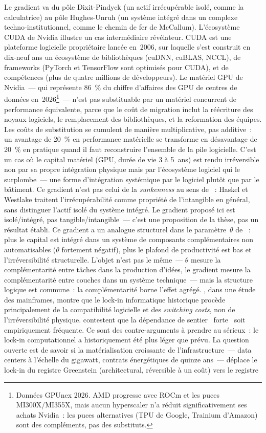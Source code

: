 Le gradient va du pôle Dixit-Pindyck (un actif irrécupérable isolé, comme la calculatrice) au pôle Hughes-Unruh (un système intégré dans un complexe techno-institutionnel, comme le chemin de fer de McCallum). L'écosystème CUDA de Nvidia illustre un cas intermédiaire révélateur. CUDA est une plateforme logicielle propriétaire lancée en~2006, sur laquelle s'est construit en dix-neuf ans un écosystème de bibliothèques (cuDNN, cuBLAS, NCCL), de frameworks (PyTorch et TensorFlow sont optimisés pour CUDA), et de compétences (plus de quatre millions de développeurs). Le matériel GPU de Nvidia~--- qui représente 86~\% du chiffre d'affaires des GPU de centres de données en~2026\footnote{Données GPUnex 2026. AMD progresse avec ROCm et les puces MI300X/MI355X, mais aucun hyperscaler n'a réduit significativement ses achats Nvidia~: les puces alternatives (TPU de Google, Trainium d'Amazon) sont des compléments, pas des substituts.}~--- n'est pas substituable par un matériel concurrent de performance équivalente, parce que le coût de migration inclut la réécriture des noyaux logiciels, le remplacement des bibliothèques, et la reformation des équipes. Les coûts de substitution se cumulent de manière multiplicative, pas additive~: un avantage de 20~\% en performance matérielle se transforme en désavantage de 20~\% en pratique quand il faut reconstruire l'ensemble de la pile logicielle. C'est un cas où le capital matériel (GPU, durée de vie 3 à 5~ans) est rendu irréversible non par sa propre intégration physique mais par l'écosystème logiciel qui le surplombe~--- une forme d'intégration systémique par le logiciel plutôt que par le bâtiment. Ce gradient n'est pas celui de la \emph{sunkenness} au sens de \textcite{haskel_capitalism_2018}~: Haskel et Westlake traitent l'irrécupérabilité comme propriété de l'intangible en général, sans distinguer l'actif isolé du système intégré. Le gradient proposé ici est isolé/intégré, pas tangible/intangible~--- c'est une proposition de la thèse, pas un résultat établi. Ce gradient a un analogue structurel dans le paramètre~$\theta$ de \textcite{jones_ai_rd_2025}~: plus le capital est intégré dans un système de composants complémentaires non automatisables ($\theta$ fortement négatif), plus le plafond de productivité est bas et l'irréversibilité structurelle. L'objet n'est pas le même~--- $\theta$ mesure la complémentarité entre tâches dans la production d'idées, le gradient mesure la complémentarité entre couches dans un système technique~--- mais la structure logique est commune~: la complémentarité borne l'effet agrégé. \textcite{greenstein_lock_in_1997}, dans une étude des mainframes, montre que le lock-in informatique historique procède principalement de la compatibilité logicielle et des \emph{switching costs}, non de l'irréversibilité physique. \textcite{liebowitz_margolis_1995} contestent que la dépendance de sentier \og~forte~\fg{} soit empiriquement fréquente. Ce sont des contre-arguments à prendre au sérieux~: le lock-in computationnel a historiquement été plus léger que prévu. La question ouverte est de savoir si la matérialisation croissante de l'infrastructure~--- data centers à l'échelle du gigawatt, contrats énergétiques de quinze ans~--- déplace le lock-in du registre Greenstein (architectural, réversible à un coût) vers le registre 